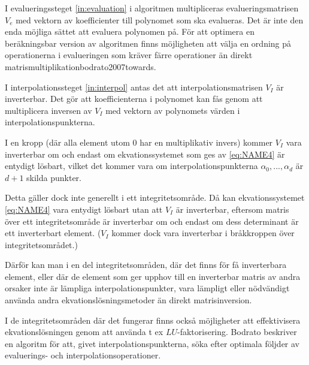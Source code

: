 I evalueringssteget \ref{in:evaluation} i algoritmen multipliceras evalueringsmatrisen 
$V_e$ med vektorn av
koefficienter till polynomet som ska evalueras. Det är inte den enda möjliga sättet
att evaluera polynomen på. För att optimera en beräkningsbar version av 
algoritmen finns möjligheten att välja en ordning på operationerna i 
evalueringen som kräver
färre operationer än direkt matrismultiplikation{bodrato2007towards}. 

I interpolationssteget \ref{in:interpol} antas det att interpolationsmatrisen 
$V_I$ är inverterbar. Det
gör att koefficienterna i polynomet kan fås genom att multiplicera inversen
av $V_I$ med vektorn av polynomets värden i interpolationspunkterna.

I en kropp (där alla element utom 0 har en multiplikativ invers) kommer $V_I$
vara inverterbar om och endast om ekvationssystemet som ges av \ref{eq:NAME4} 
är entydigt lösbart, vilket det kommer vara om  interpolationspunkterna 
$\alpha_0, ...,  \alpha_d$ är $d + 1$ skilda punkter.

Detta gäller dock inte generellt i ett integritetsområde. 
Då kan ekvationssystemet \ref{eq:NAME4} vara entydigt lösbart
utan att $V_I$ är inverterbar, eftersom matris över ett integritetsområde 
är inverterbar om och endast om dess determinant är ett inverterbart
element\cite{sombatboriboon2011some}. 
($V_I$ kommer dock vara inverterbar i bråkkroppen över integritetsområdet.)
 
Därför kan man i en del integritetsområden, där det finns för få inverterbara element,
eller där de element som ger upphov till en inverterbar matris av andra orsaker inte är 
lämpliga interpolationspunkter, vara lämpligt eller nödvändigt använda andra 
ekvationslösningsmetoder än direkt matrisinversion. 


I de integritetsområden där det fungerar finns också möjligheter att effektivisera 
ekvationslösningen genom att använda t ex $LU$-faktorisering.
Bodrato\cite{bodrato2007towards}\cite{bodrato2007b} beskriver en algoritm för att, givet
interpolationspunkterna, söka efter optimala följder av evaluerings- och interpolationsoperationer.

